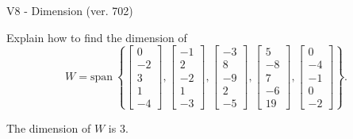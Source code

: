 \begin{exercise}
  \begin{exerciseTitle}V8 - Dimension (ver. 702)\end{exerciseTitle}
  \begin{exerciseStatement}
    Explain how to find the dimension of 
\[W=\mathrm{span}\ \left\{\left[\begin{array}{r}
0 \\
-2 \\
3 \\
1 \\
-4
\end{array}\right] , \left[\begin{array}{r}
-1 \\
2 \\
-2 \\
1 \\
-3
\end{array}\right] , \left[\begin{array}{r}
-3 \\
8 \\
-9 \\
2 \\
-5
\end{array}\right] , \left[\begin{array}{r}
5 \\
-8 \\
7 \\
-6 \\
19
\end{array}\right] , \left[\begin{array}{r}
0 \\
-4 \\
-1 \\
0 \\
-2
\end{array}\right]\right\}.\]



  \end{exerciseStatement}
  \begin{exerciseAnswer}
   The dimension of \(W\) is  \(3\).
  


  \end{exerciseAnswer}
\end{exercise}